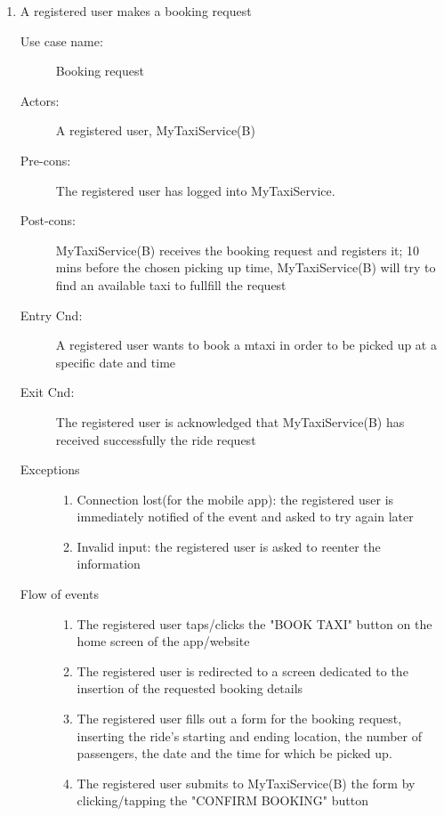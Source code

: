 \documentclass[11pt]{article} %
\begin{document}
\begin{enumerate}
	
	      \item A registered user makes a booking request
		\begin{description}
		         \item [Use case name:] Booking request
		         \item [Actors:] A registered user, MyTaxiService(B)
		         \item [Pre-cons:] The registered user has logged into MyTaxiService.
		         \item [Post-cons:] MyTaxiService(B) receives the booking request and registers it; 10 mins before
		         the chosen picking up time, MyTaxiService(B) will try to find an available taxi to fullfill the request
		         \item [Entry Cnd:] A registered user wants to book a mtaxi in order to be picked up at a specific date and time
		         \item [Exit Cnd:] The registered user is acknowledged that MyTaxiService(B) has received successfully the ride
		         request
		         \item [Exceptions]\hfill
			\begin{enumerate}
			           \item Connection lost(for the mobile app): the registered user is immediately notified of the event and
			           asked to try again later
				\item Invalid input: the registered user is asked to reenter the information
			\end{enumerate}
		         \item [Flow of events]\hfill
			\begin{enumerate}
			           \item The registered user taps/clicks the "BOOK TAXI" button on the home screen of the app/website
			           \item The registered user is redirected to a screen dedicated to the insertion
			           of the requested booking details
			           \item The registered user fills out a form for the booking request, inserting the ride's starting and ending location,
			           the number of passengers, the date and the time for which be picked up.
			           \item The registered user submits to MyTaxiService(B) the form by clicking/tapping the "CONFIRM BOOKING" button
			\end{enumerate}
		\end{description}
	

\end{enumerate}
\end{document}
